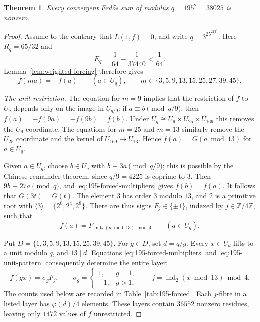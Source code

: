 \documentclass[11pt]{amsart}
\newtheorem{theorem}{Theorem}[section]
\theoremstyle{definition}
\theoremstyle{remark}
\numberwithin{equation}{section}
\begin{document}
\begin{theorem}\label{thm:q195-exclusion}
Every convergent Erd\H{o}s sum of modulus $q=195^2=38025$ is nonzero.
\end{theorem}

\begin{proof}
Assume to the contrary that $L(1,f)=0$, and write $q=3^25^213^2$.
Here $R_q=65/32$ and
\[
 E_q=\frac1{64}-\frac1{37440}<\frac1{64}.
\]
Lemma~\ref{lem:weighted-forcing} therefore gives
\begin{equation}\label{eq:195-forced-multipliers}
 f(ma)=-f(a)\qquad(a\in U_q),\qquad
 m\in\{3,5,9,13,15,25,27,39,45\}.
\end{equation}

\smallskip\noindent
\emph{The unit restriction.}
The equation for $m=9$ implies that the restriction of $f$ to $U_q$ depends
only on the image in $U_{q/9}$: if $a\equiv b\pmod{q/9}$, then
$f(a)=-f(9a)=-f(9b)=f(b)$.
Under $U_q\cong U_9\times U_{25}\times U_{169}$ this removes the $U_9$
coordinate.  The equations for $m=25$ and $m=13$ similarly remove the
$U_{25}$ coordinate and the kernel of $U_{169}\to U_{13}$.
Hence $f(a)=G(a\bmod13)$ for $a\in U_q$.

Given $a\in U_q$, choose $b\in U_q$ with
$b\equiv3a\pmod{q/9}$; this is possible by the Chinese remainder theorem,
since $q/9=4225$ is coprime to $3$.
Then $9b\equiv27a\pmod q$, and
\eqref{eq:195-forced-multipliers} gives $f(b)=f(a)$.
It follows that $G(3t)=G(t)$.
The element $3$ has order $3$ modulo $13$, and $2$ is a primitive root with
$\langle3\rangle=\{2^0,2^4,2^8\}$.
There are thus signs $F_j\in\{\pm1\}$, indexed by $j\in\mathbb Z/4\mathbb Z$,
such that
\begin{equation}\label{eq:195-unit-pattern}
 f(a)=F_{\operatorname{ind}_2(a\bmod13)\bmod4}\qquad(a\in U_q).
\end{equation}

Put $D=\{1,3,5,9,13,15,25,39,45\}$.
For $g\in D$, set $d=q/g$.  Every $x\in U_d$ lifts to a unit modulo $q$,
and $13\mid d$.  Equations \eqref{eq:195-forced-multipliers} and
\eqref{eq:195-unit-pattern} consequently determine the entire layer:
\begin{equation}\label{eq:195-forced-layers}
 f(gx)=\sigma_gF_j,\qquad
 \sigma_g=\begin{cases}1,&g=1,\\-1,&g>1,\end{cases}
 \qquad j=\operatorname{ind}_2(x\bmod13)\bmod4.
\end{equation}
The counts used below are recorded in Table~\ref{tab:195-forced}.
Each $j$-fibre in a listed layer has $\varphi(d)/4$ elements.
These layers contain $36552$ nonzero residues, leaving only $1472$ values
of $f$ unrestricted.


\end{proof}
\end{document}
